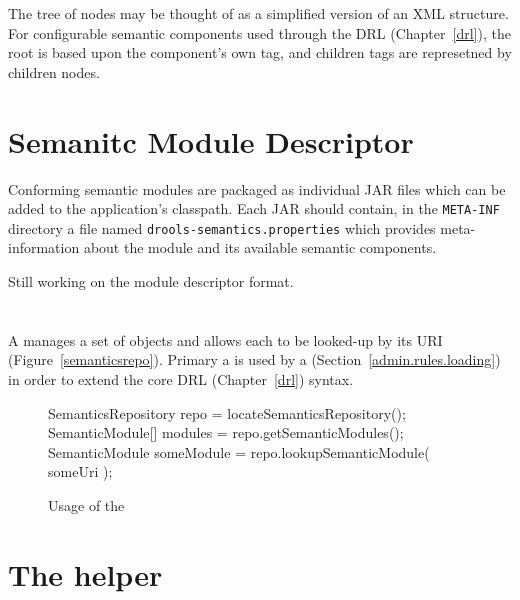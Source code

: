 The tree of  nodes may be thought of as
a simplified version of an XML structure.  For configurable semantic
components used through the DRL (Chapter~\vref{drl}), the root 
 is based upon the component's own tag, and
children tags are represetned by children 
nodes.

\section{Semanitc Module Descriptor}
\label{module.descriptor}

Conforming semantic modules are packaged as individual JAR files which
can be added to the application's classpath.  Each JAR should contain,
in the \texttt{META-INF} directory a file named
\texttt{drools-semantics.properties} which provides meta-information about
the module and its available semantic components.

\begin{implnote}
Still working on the module descriptor format.
\end{implnote}

\section{}

A  manages a set of
 objects and allows each to be looked-up
by its URI (Figure~\vref{semanticsrepo}).  Primary a  is used by
a  (Section~\vref{admin.rules.loading})
in order to extend the core DRL (Chapter~\vref{drl}) syntax.

\begin{figure}
\begin{javaCodelisting}
SemanticsRepository repo       = locateSemanticsRepository();
SemanticModule[]    modules    = repo.getSemanticModules();
SemanticModule      someModule = repo.lookupSemanticModule( someUri );
\end{javaCodelisting}
\caption{Usage of the }
\label{semanticsrepo}
\end{figure}

\section{The  helper}

